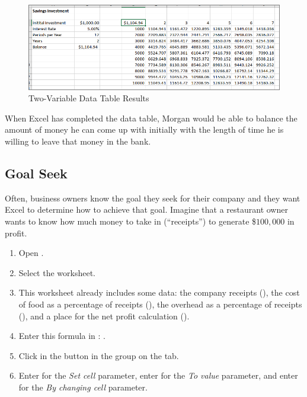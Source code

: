 \begin{figure}[H]
\centering
\includegraphics[width=\maxwidth{.95\linewidth}]{gfx/ch07_fig50}
\caption{Two-Variable Data Table Results}
\label{07:fig50}
\end{figure}

When Excel has completed the data table, Morgan would be able to balance the amount of money he can come up with initially with the length of time he is willing to leave that money in the bank.

\subsection{Goal Seek}

Often, business owners know the goal they seek for their company and they want Excel to determine how to achieve that goal. Imagine that a restaurant owner wants to know how much money to take in (``receipts'') to generate \$$ 100,000 $ in profit.

\begin{enumerate}
	\item Open .
	\item Select the  worksheet.
	\item This worksheet already includes some data: the company receipts (), the cost of food as a percentage of receipts (), the overhead as a percentage of receipts (), and a place for the net profit calculation ().
	\item Enter this formula in : .
	\item Click  in the  button in the  group on the  tab.
	\item Enter  for the \textit{Set cell} parameter, enter  for the \textit{To value} parameter, and enter  for the \textit{By changing cell} parameter.
\end{enumerate}

